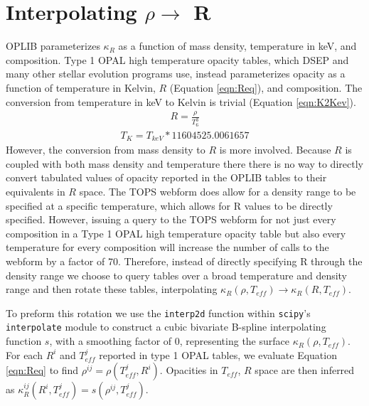 \section{Interpolating $\rho \rightarrow $ R}\label{apx:interp}
OPLIB parameterizes $\kappa_{R}$ as a function of mass density, temperature in keV,
and composition. Type 1 OPAL high temperature opacity tables, which DSEP and
many other stellar evolution programs use, instead parameterizes opacity as a function
of temperature in Kelvin, $R$ (Equation \ref{eqn:Req}), and composition. The
conversion from temperature in keV to Kelvin is trivial (Equation
\ref{eqn:K2Kev}).
\begin{align}\label{eqn:Req}
	R = \frac{\rho}{T_{6}^{3}}
\end{align}
\begin{align}\label{eqn:K2Kev}
	T_{K} = T_{keV} * 11604525.0061657
\end{align}
However, the conversion from mass density to $R$ is more involved. Because $R$
is coupled with both mass density and temperature there there is no way to
directly convert tabulated values of opacity reported in the OPLIB tables to
their equivalents in $R$ space. The TOPS webform does allow for a
density range to be specified at a specific temperature, which allows for R
values to be directly specified. However, issuing a query to the TOPS webform
for not just every composition in a Type 1 OPAL high temperature opacity table
but also every temperature for every composition will increase the number of
calls to the webform by a factor of 70. Therefore, instead of directly
specifying R through the density range we choose to query tables over a
broad temperature and density range and then rotate these tables,
interpolating $\kappa_{R}(\rho,T_{eff}) \rightarrow \kappa_{R}(R,T_{eff})$. 


To preform this rotation we use the \texttt{interp2d} function within
\texttt{scipy}'s \texttt{interpolate} \citep{2020SciPy-NMeth} module to
construct a cubic bivariate B-spline \citep{Dierckx1981} interpolating function
$s$, with a smoothing factor of 0, representing the surface $\kappa_{R}(\rho,
T_{eff})$. For each $R^{i}$ and $T^{j}_{eff}$ reported in type 1 OPAL tables,
we evaluate Equation \ref{eqn:Req} to find $\rho^{ij} =
\rho(T^{j}_{eff},R^{i})$.  Opacities in $T_{eff}$, $R$ space are then inferred
as $\kappa^{ij}_{R}(R^{i},T^{j}_{eff}) = s(\rho^{ij}, T^{j}_{eff})$. 


